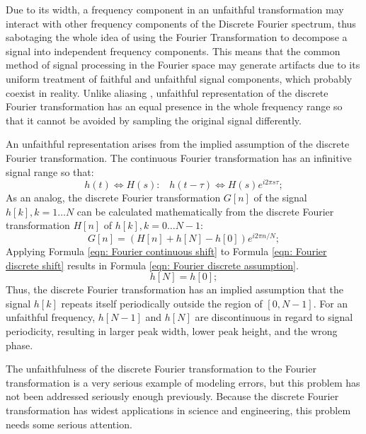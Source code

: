 \documentclass[twoside]{article}
\numberwithin{equation}{section}
\newcommand{\eqspace}{\;\;\;}
\begin{document}
Due to its width, a frequency component in an unfaithful transformation may interact with other frequency components of the Discrete Fourier spectrum, thus sabotaging the whole idea of using the Fourier Transformation to decompose a signal into independent frequency components.  
This means that the common method of signal processing in the Fourier space \cite{Numerical_Recipes}\cite{Stochastic_Arithmetic}\cite{Floating-point_Digital_Filters} may generate artifacts due to its uniform treatment of faithful and unfaithful signal components, which probably coexist in reality.  
Unlike aliasing \cite{Electronics}\cite{Numerical_Recipes}\cite{Floating-point_Digital_Filters}, unfaithful representation of the discrete Fourier transformation has an equal presence in the whole frequency range so that it cannot be avoided by sampling the original signal differently.

An unfaithful representation arises from the implied assumption of the discrete Fourier transformation.  
The continuous Fourier transformation has an infinitive signal range so that:
\begin{equation}
\label{eqn: Fourier continuous shift}
h(t) \Leftrightarrow H(s): \eqspace h(t - \tau) \Leftrightarrow H(s) e^{i 2\pi s \tau};
\end{equation}
As an analog, the discrete Fourier transformation $G[n]$ of the signal $h[k], k = 1 \dots N$ can be calculated mathematically from the discrete Fourier transformation $H[n]$ of $h[k], k = 0\dots N-1$:
\begin{equation}
\label{eqn: Fourier discrete shift}
G[n] = (H[n] + h[N] - h[0]) e^{i 2\pi n/N};
\end{equation}
Applying Formula \eqref{eqn: Fourier continuous shift} to Formula \eqref{eqn: Fourier discrete shift} results in Formula \eqref{eqn: Fourier discrete assumption}.
\begin{equation}
\label{eqn: Fourier discrete assumption}
h[N] = h[0];
\end{equation}
Thus, the discrete Fourier transformation has an implied assumption that the signal $h[k]$ repeats itself periodically outside the region of $[0, N-1]$.  
For an unfaithful frequency, $h[N-1]$ and $h[N]$ are discontinuous in regard to signal periodicity, resulting in larger peak width, lower peak height, and the wrong phase.  

The unfaithfulness of the discrete Fourier transformation to the Fourier transformation is a very serious example of modeling errors, but this problem has not been addressed seriously enough previously.
Because the discrete Fourier transformation has widest applications in science and engineering, this problem needs some serious attention.
\end{document}
